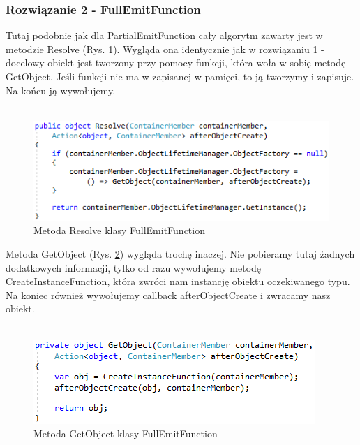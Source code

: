 \documentclass[12pt]{article}
\begin{document}
\subsubsection{Rozwiązanie 2 - FullEmitFunction}
Tutaj podobnie jak dla PartialEmitFunction cały algorytm zawarty jest w metodzie Resolve (Rys. \ref{fig:FullEmitFunction_Resolve}). Wygląda ona identycznie jak w rozwiązaniu 1 - docelowy obiekt jest tworzony przy pomocy funkcji, która woła w sobię metodę GetObject. Jeśli funkcji nie ma w zapisanej w pamięci, to ją tworzymy i zapisuje. Na końcu ją wywołujemy.\\ \\
\begin{figure}[H]
	\begin{center}
  		\includegraphics{FullEmitFunction_Resolve.png}
  		\caption{Metoda Resolve klasy FullEmitFunction}
  		\label{fig:FullEmitFunction_Resolve}
	\end{center}
\end{figure}

Metoda GetObject (Rys. \ref{fig:FullEmitFunction_GetObject}) wygląda trochę inaczej. Nie pobieramy tutaj żadnych dodatkowych informacji, tylko od razu wywołujemy metodę CreateInstanceFunction, która zwróci nam instancję obiektu oczekiwanego typu. Na koniec również wywołujemy callback afterObjectCreate i zwracamy nasz obiekt.\\ \\
\begin{figure}[H]
	\begin{center}
  		\includegraphics{FullEmitFunction_GetObject.png}
  		\caption{Metoda GetObject klasy FullEmitFunction}
  		\label{fig:FullEmitFunction_GetObject}
	\end{center}
\end{figure}
\end{document}
